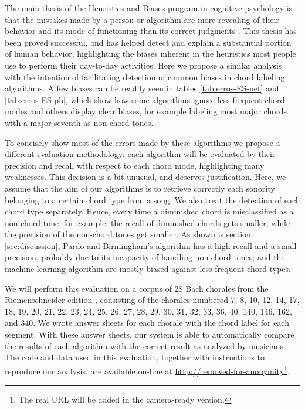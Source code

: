 The main thesis of the Heuristics and Biases program in cognitive
psychology is that the mistakes made by a person or algorithm are more
revealing of their behavior and its mode of functioning than its
correct judgments \cite{gilovich.ea02:heuristics}. This thesis has
been proved successful, and has helped detect and explain a
substantial portion of human behavior, highlighting the biases
inherent in the heuristics most people use to perform their day-to-day
activities. Here we propose a similar analysis with the intention of
facilitating detection of common biases in chord labeling
algorithms. A few biases can be readily seen in tables
\ref{tab:erros-ES-net} and \ref{tab:erros-ES-pb}, which show how some
algorithms ignore less frequent chord modes and others display clear
biases, for example labeling most major chords with a major seventh as
non-chord tones.

To concisely show most of the errors made by these algorithms we
propose a different evaluation methodology: each algorithm will be
evaluated by their precision and recall with respect to each chord
mode, highlighting many weaknesses. This decision is a bit unusual,
and deserves justification. Here, we assume that the aim of our
algorithms is to retrieve correctly each sonority belonging to a
certain chord type from a song. We also treat the detection of each
chord type separately. Hence, every time a diminished chord is
misclassified as a non chord tone, for example, the recall of
diminished chords gets smaller, while the precision of the non-chord
tones get smaller. As shown is section \ref{sec:discussion}, Pardo and
Birmingham's algorithm has a high recall and a small precision,
probably due to its incapacity of handling non-chord tones; and the
machine learning algorithm are mostly biased against less frequent
chord types.

We will perform this evaluation on a corpus of 28 Bach chorales from
the Riemenschneider edition \cite{bach41:371}, consisting of the
chorales numbered 7, 8, 10, 12, 14, 17, 18, 19, 20, 21, 22, 23, 24,
25, 26, 27, 28, 29, 30, 31, 32, 33, 36, 40, 140, 146, 162, and 340. We
wrote answer sheets for each chorale with the chord label for each
segment. With these answer sheets, our system is able to automatically
compare the results of each algorithm with the correct result as
analyzed by musicians. The code and data used in this evaluation,
together with instructions to reproduce our analysis, are available
on-line at \url{http://removed-for-anonymity}\footnote{The real URL
  will be added in the camera-ready version.}.

